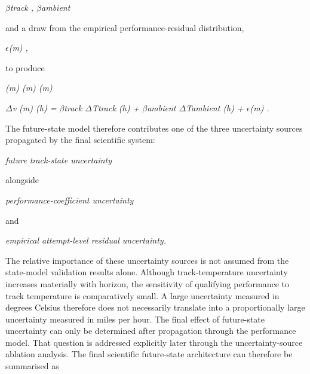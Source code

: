 \begin{center}\textit{\ensuremath{\beta}track , \ensuremath{\beta}ambient}\end{center}

and a draw from the empirical performance-residual distribution,

\begin{center}\textit{\ensuremath{\epsilon}(m) ,}\end{center}

to produce

\begin{center}\textit{(m)     (m)                  (m)}\end{center}

\begin{center}\textit{\ensuremath{\Delta}v (m) (h) = \ensuremath{\beta}track \ensuremath{\Delta}Ttrack (h) + \ensuremath{\beta}ambient \ensuremath{\Delta}Tambient (h) + \ensuremath{\epsilon}(m) .}\end{center}

The future-state model therefore contributes one of the three uncertainty sources propagated by the final scientific system:

\begin{center}\textit{future track-state uncertainty}\end{center}

alongside

\begin{center}\textit{performance-coefficient uncertainty}\end{center}

and

\begin{center}\textit{empirical attempt-level residual uncertainty.}\end{center}

The relative importance of these uncertainty sources is not assumed from the state-model validation results alone. Although track-temperature uncertainty increases materially with horizon, the sensitivity of qualifying performance to track temperature is comparatively small. A large uncertainty measured in degrees Celsius therefore does not necessarily translate into a proportionally large uncertainty measured in miles per hour. The final effect of future-state uncertainty can only be determined after propagation through the performance model. That question is addressed explicitly later through the uncertainty-source ablation analysis. The final scientific future-state architecture can therefore be summarised as

